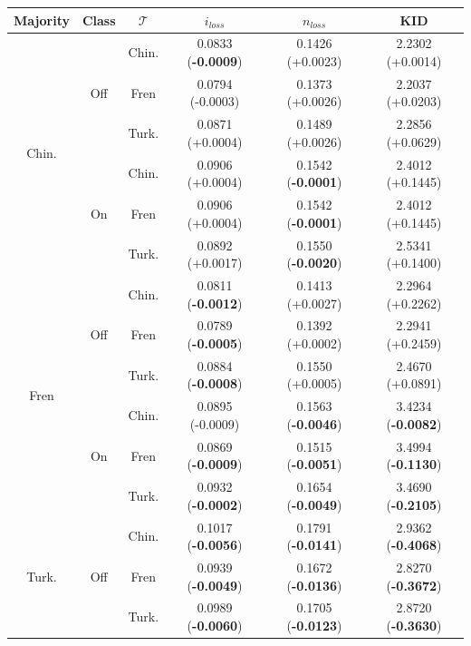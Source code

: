 \begin{table}[]
\centering
\begin{tabular}{c|c|c|c|c|c}
    \textbf{Majority} & \textbf{Class} & \textbf{$\mathcal{T}$} & \textbf{$i_{loss}$} & \textbf{$n_{loss}$} & \textbf{KID} \\
    \toprule
\multirow{6}{*}{Chin.} & \multirow{3}{*}{Off} & Chin. & 0.0833 (\textbf{-0.0009})       & 0.1426 (+0.0023)       & 2.2302 (+0.0014)   \\
 &  & Fren & 0.0794 (-0.0003)       & 0.1373 (+0.0026)       & 2.2037 (+0.0203)   \\
 &  & Turk. & 0.0871 (+0.0004)       & 0.1489 (+0.0026)       & 2.2856 (+0.0629)  \\
\hhline{~-----}
 & \multirow{3}{*}{On} & Chin. & 0.0906 (+0.0004)       & 0.1542 (\textbf{-0.0001})       & 2.4012 (+0.1445) \\
 &  & Fren & 0.0906 (+0.0004)       & 0.1542 (\textbf{-0.0001})       & 2.4012 (+0.1445) \\
 &  & Turk. & 0.0892 (+0.0017)       & 0.1550 (\textbf{-0.0020})       & 2.5341 (+0.1400)   \\
\midrule
\multirow{6}{*}{Fren} & \multirow{3}{*}{Off} & Chin. & 0.0811 (\textbf{-0.0012})       & 0.1413 (+0.0027)       & 2.2964 (+0.2262) \\
 &  & Fren &0.0789 (\textbf{-0.0005})       & 0.1392 (+0.0002)       & 2.2941 (+0.2459)  \\
 &  & Turk. & 0.0884 (\textbf{-0.0008})       & 0.1550 (+0.0005)       & 2.4670 (+0.0891) \\
\hhline{~-----}
 & \multirow{3}{*}{On} & Chin. & 0.0895 (-0.0009)       & 0.1563 (\textbf{-0.0046})       & 3.4234 (\textbf{-0.0082})\\
 &  & Fren & 0.0869 (\textbf{-0.0009})       & 0.1515 (\textbf{-0.0051})       & 3.4994 (\textbf{-0.1130}) \\
 &  & Turk. & 0.0932 (\textbf{-0.0002})       & 0.1654 (\textbf{-0.0049})       & 3.4690 (\textbf{-0.2105})  \\
\midrule
\multirow{6}{*}{Turk.} & \multirow{3}{*}{Off} & Chin. & 0.1017 (\textbf{-0.0056})       & 0.1791 (\textbf{-0.0141})       & 2.9362 (\textbf{-0.4068}) \\
 &  & Fren & 0.0939 (\textbf{-0.0049})       & 0.1672 (\textbf{-0.0136})       & 2.8270 (\textbf{-0.3672}) \\
 &  & Turk. &  0.0989 (\textbf{-0.0060})       & 0.1705 (\textbf{-0.0123})       & 2.8720 (\textbf{-0.3630}) \\

\end{tabular}
\end{table}
